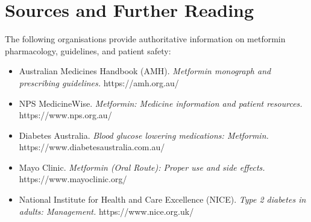 \section*{Sources and Further Reading}
The following organisations provide authoritative information on metformin pharmacology, guidelines, and patient safety:
\begin{itemize}
    \item Australian Medicines Handbook (AMH). \textit{Metformin monograph and prescribing guidelines.} https://amh.org.au/
    \item NPS MedicineWise. \textit{Metformin: Medicine information and patient resources.} https://www.nps.org.au/
    \item Diabetes Australia. \textit{Blood glucose lowering medications: Metformin.} https://www.diabetesaustralia.com.au/
    \item Mayo Clinic. \textit{Metformin (Oral Route): Proper use and side effects.} https://www.mayoclinic.org/
    \item National Institute for Health and Care Excellence (NICE). \textit{Type 2 diabetes in adults: Management.} https://www.nice.org.uk/
\end{itemize}
